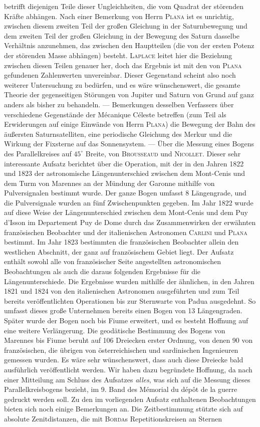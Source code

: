 betrifft diejenigen Teile dieser Ungleichheiten, die vom Quadrat der störenden Kräfte abhängen. Nach einer Bemerkung von Herrn \textsc{Plana} ist es unrichtig, zwischen diesem zweiten Teil der großen Gleichung in der Saturnbewegung und dem zweiten Teil der großen Gleichung in der Bewegung des Saturn dasselbe Verhältnis anzunehmen, das zwischen den Hauptteilen (die von der ersten Potenz der störenden Masse abhängen) besteht. \textsc{Laplace} leitet hier die Beziehung zwischen diesen Teilen genauer her, doch das Ergebnis ist mit den von \textsc{Plana} gefundenen Zahlenwerten unvereinbar. Dieser Gegenstand scheint also noch weiterer Untersuchung zu bedürfen, und es wäre wünschenswert, die gesamte Theorie der gegenseitigen Störungen von Jupiter und Saturn von Grund auf ganz anders als bisher zu behandeln. --- Bemerkungen desselben Verfassers über verschiedene Gegenstände der Mécanique Céleste betreffen (zum Teil als Erwiderungen auf einige Einwände von Herrn \textsc{Plana}) die Bewegung der Bahn des äußersten Saturnsatelliten, eine periodische Gleichung des Merkur und die Wirkung der Fixsterne auf das Sonnensystem. --- Über die Messung eines Bogens des Parallelkreises auf $45^\circ$ Breite, von \textsc{Brousseaud} und \textsc{Nicollet}. Dieser sehr interessante Aufsatz berichtet über die Operation, mit der in den Jahren 1822 und 1823 der astronomische Längenunterschied zwischen dem Mont-Cenis und dem Turm von Marennes an der Mündung der Garonne mithilfe von Pulversignalen bestimmt wurde. Der ganze Bogen umfasst 8 Längengrade, und die Pulversignale wurden an fünf Zwischenpunkten gegeben. Im Jahr 1822 wurde auf diese Weise der Längenunterschied zwischen dem Mont-Cenis und dem Puy d'Isson im Departement Puy de Dome durch das Zusammenwirken der erwähnten französischen Beobachter und der italienischen Astronomen \textsc{Carlini} und \textsc{Plana} bestimmt. Im Jahr 1823 bestimmten die französischen Beobachter allein den westlichen Abschnitt, der ganz auf französischem Gebiet liegt. Der Aufsatz enthält sowohl alle von französischer Seite angestellten astronomischen Beobachtungen als auch die daraus folgenden Ergebnisse für die Längenunterschiede. Die Ergebnisse wurden mithilfe der ähnlichen, in den Jahren 1821 und 1824 von den italienischen Astronomen ausgeführten und zum Teil bereits veröffentlichten Operationen bis zur Sternwarte von Padua ausgedehnt. So umfasst dieses große Unternehmen bereits einen Bogen von 13 Längengraden. Später wurde der Bogen noch bis Fiume erweitert, und es besteht Hoffnung auf eine weitere Verlängerung. Die geodätische Bestimmung des Bogens von Marennes bis Fiume beruht auf 106 Dreiecken erster Ordnung, von denen 90 von französischen, die übrigen von österreichischen und sardinischen Ingenieuren gemessen wurden. Es wäre sehr wünschenswert, dass auch diese Dreiecke bald ausführlich veröffentlicht werden. Wir haben dazu begründete Hoffnung, da nach einer Mitteilung am Schluss des Aufsatzes \emph{alles}, was sich auf die Messung dieses Parallelkreisbogens bezieht, im 9. Band des Mémorial du dépôt de la guerre gedruckt werden soll. Zu den im vorliegenden Aufsatz  enthaltenen Beobachtungen bieten sich noch einige Bemerkungen an. Die Zeitbestimmung stützte sich auf absolute Zenitdistanzen, die mit \textsc{Borda}s Repetitionskreisen an Sternen 